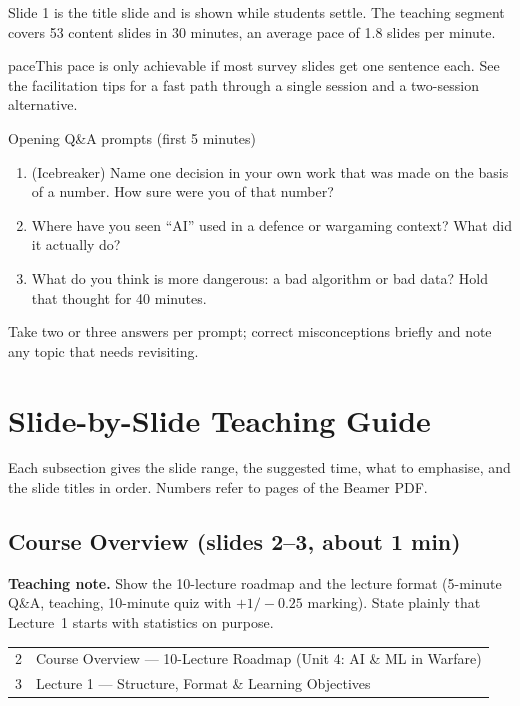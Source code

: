 \documentclass[11pt]{article}
\begin{document}
Slide 1 is the title slide and is shown while students settle. The teaching segment covers 53 content slides in 30 minutes, an average pace of 1.8 slides per minute. 

\begin{pitfall}{pace}This pace is only achievable if most survey slides get one sentence each. See the facilitation tips for a fast path through a single session and a two-session alternative.\end{pitfall}

\begin{instr}{Opening Q\&A prompts (first 5 minutes)}\begin{enumerate}\item (Icebreaker) Name one decision in your own work that was made on the basis of a number. How sure were you of that number?\item Where have you seen ``AI'' used in a defence or wargaming context? What did it actually do?\item What do you think is more dangerous: a bad algorithm or bad data? Hold that thought for 40 minutes.\end{enumerate}Take two or three answers per prompt; correct misconceptions briefly and note any topic that needs revisiting.\end{instr}

\section{Slide-by-Slide Teaching Guide}

Each subsection gives the slide range, the suggested time, what to emphasise, and the slide titles in order. Numbers refer to pages of the Beamer PDF.

\subsection{Course Overview \normalfont\small\color{GreyN}(slides 2--3, about 1 min)}

\textbf{Teaching note.} Show the 10-lecture roadmap and the lecture format (5-minute Q\&A, teaching, 10-minute quiz with $+1/-0.25$ marking). State plainly that Lecture~1 starts with statistics on purpose.

\begin{center}\small\renewcommand{\arraystretch}{1.1}\begin{tabularx}{\textwidth}{@{}r X@{}}2 & Course Overview --- 10-Lecture Roadmap (Unit 4: AI \& ML in Warfare)\\
3 & Lecture 1 --- Structure, Format \& Learning Objectives\\\end{tabularx}\end{center}
\end{document}
